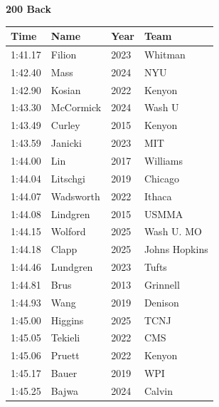 \noindent\begin{minipage}[t]{0.98\textwidth}
\centering
\textbf{\textcolor{teamprimary}{200 Back}}\par
\vspace{0.5em}
\centering
\small
\renewcommand{\arraystretch}{1.0}
\setlength{\tabcolsep}{4pt}
\begin{tabular}{@{}p{2.5cm}p{4.5cm}p{1.5cm}p{2.5cm}@{}}
\toprule
\textbf{Time} & \textbf{Name} & \textbf{Year} & \textbf{Team} \\
\midrule
1:41.17 & Filion & 2023 & Whitman \\
1:42.40 & Mass & 2024 & NYU \\
1:42.90 & Kosian & 2022 & Kenyon \\
1:43.30 & McCormick & 2024 & Wash U \\
1:43.49 & Curley & 2015 & Kenyon \\
1:43.59 & Janicki & 2023 & MIT \\
1:44.00 & Lin & 2017 & Williams \\
1:44.04 & Litschgi & 2019 & Chicago \\
1:44.07 & Wadsworth & 2022 & Ithaca \\
1:44.08 & Lindgren & 2015 & USMMA \\
1:44.15 & Wolford & 2025 & Wash U. MO \\
1:44.18  & Clapp & 2025 & Johns Hopkins \\
1:44.46 & Lundgren & 2023 & Tufts \\
1:44.81 & Brus & 2013 & Grinnell \\
1:44.93 & Wang & 2019 & Denison \\
1:45.00 & Higgins & 2025 & TCNJ \\
1:45.05 & Tekieli & 2022 & CMS \\
1:45.06 & Pruett & 2022 & Kenyon \\
1:45.17 & Bauer & 2019 & WPI \\
1:45.25 & Bajwa & 2024 & Calvin \\
\bottomrule
\end{tabular}
\end{minipage}
\vspace{1.2em}
